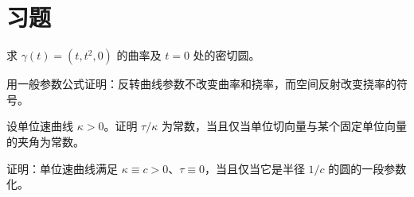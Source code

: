 \section{习题}
\begin{exercise}\label{ex:dg-curves-parabola}
求 $\gamma(t)=(t,t^2,0)$ 的曲率及 $t=0$ 处的密切圆。
\end{exercise}
\begin{exercise}\label{ex:dg-curves-reverse}
用一般参数公式证明：反转曲线参数不改变曲率和挠率，而空间反射改变挠率的符号。
\end{exercise}
\begin{exercise}\label{ex:dg-curves-lancret}
设单位速曲线 $\kappa>0$。证明 $\tau/\kappa$ 为常数，当且仅当单位切向量与某个固定单位向量的夹角为常数。
\end{exercise}
\begin{exercise}\label{ex:dg-curves-circle}
证明：单位速曲线满足 $\kappa\equiv c>0$、$\tau\equiv0$，当且仅当它是半径 $1/c$ 的圆的一段参数化。
\end{exercise}

